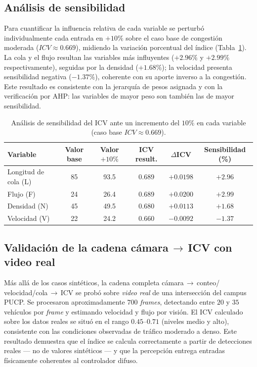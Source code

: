 \subsection{Análisis de sensibilidad}\label{subsec:icv-sensibilidad}

Para cuantificar la influencia relativa de cada variable se perturbó individualmente cada
entrada en $+10\%$ sobre el caso base de congestión moderada ($ICV\approx 0.669$), midiendo la
variación porcentual del índice (Tabla~\ref{tab:sensibilidad}). La cola y el flujo resultan las
variables más influyentes ($+2.96\%$ y $+2.99\%$ respectivamente), seguidas por la densidad
($+1.68\%$); la velocidad presenta sensibilidad negativa ($-1.37\%$), coherente con su aporte
inverso a la congestión. Este resultado es consistente con la jerarquía de pesos asignada y con
la verificación por AHP: las variables de mayor peso son también las de mayor sensibilidad.

\begin{table}[H]
  \centering
  \caption{Análisis de sensibilidad del ICV ante un incremento del $10\%$ en cada variable
  (caso base $ICV\approx 0.669$).}
  \label{tab:sensibilidad}
  \begin{tabular}{@{}lccccc@{}}
    \toprule
    \textbf{Variable} & \textbf{Valor base} & \textbf{Valor $+10\%$} &
    \textbf{ICV result.} & \textbf{$\Delta$ICV} & \textbf{Sensibilidad (\%)} \\
    \midrule
    Longitud de cola (L)  & 85 & 93.5 & 0.689 & $+0.0198$ & $+2.96$ \\
    Flujo (F)             & 24 & 26.4 & 0.689 & $+0.0200$ & $+2.99$ \\
    Densidad (N)          & 45 & 49.5 & 0.680 & $+0.0113$ & $+1.68$ \\
    Velocidad (V)         & 22 & 24.2 & 0.660 & $-0.0092$ & $-1.37$ \\
    \bottomrule
  \end{tabular}
\end{table}

\subsection{Validación de la cadena cámara\,$\rightarrow$\,ICV con video real}\label{subsec:icv-video}

Más allá de los casos sintéticos, la cadena completa cámara\,$\rightarrow$\,conteo/
velocidad/cola\,$\rightarrow$\,ICV se probó sobre \emph{video real} de una intersección del
campus PUCP. Se procesaron aproximadamente $700$ \emph{frames}, detectando entre $20$ y $35$
vehículos por \emph{frame} y estimando velocidad y flujo por visión. El ICV calculado sobre los
datos reales se situó en el rango $0.45$--$0.71$ (niveles medio y alto), consistente con las
condiciones observadas de tráfico moderado a denso. Este resultado demuestra que el índice se
calcula correctamente a partir de detecciones reales --- no de valores sintéticos --- y que la
percepción entrega entradas físicamente coherentes al controlador difuso.

